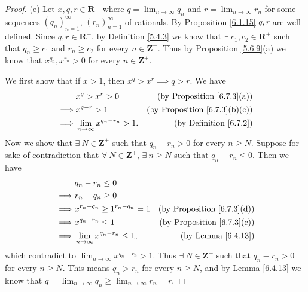 \begin{proof}{(e)}
    Let \(x, q, r \in \mathbf{R}^+\) where \(q = \lim_{n \to \infty} q_n\) and \(r = \lim_{n \to \infty} r_n\) for some sequences \((q_n)_{n = 1}^\infty\), \((r_n)_{n = 1}^\infty\) of rationals.
    By Proposition \ref{6.1.15} \(q, r\) are well-defined.
    Since \(q, r \in \mathbf{R}^+\), by Definition \ref{5.4.3} we know that \(\exists\ c_1, c_2 \in \mathbf{R}^+\) such that \(q_n \geq c_1\) and \(r_n \geq c_2\) for every \(n \in \mathbf{Z}^+\).
    Thus by Proposition \ref{5.6.9}(a) we know that \(x^{q_n}, x^{r_n} > 0\) for every \(n \in \mathbf{Z}^+\).

    We first show that if \(x > 1\), then \(x^q > x^r \implies q > r\).
    We have
    \begin{align*}
                 & x^q > x^r > 0                          & \text{(by Proposition \ref{6.7.3}(a))}    \\
        \implies & x^{q - r} > 1                          & \text{(by Proposition \ref{6.7.3}(b)(c))} \\
        \implies & \lim_{n \to \infty} x^{q_n - r_n} > 1. & \text{(by Definition \ref{6.7.2})}        \\
    \end{align*}
    Now we show that \(\exists\ N \in \mathbf{Z}^+\) such that \(q_n - r_n > 0\) for every \(n \geq N\).
    Suppose for sake of contradiction that \(\forall\ N \in \mathbf{Z}^+\), \(\exists\ n \geq N\) such that \(q_n - r_n \leq 0\).
    Then we have
    \begin{align*}
                 & q_n - r_n \leq 0                                                                   \\
        \implies & r_n - q_n \geq 0                                                                   \\
        \implies & x^{r_n - q_n} \geq 1^{r_n - q_n} = 1      & \text{(by Proposition \ref{6.7.3}(d))} \\
        \implies & x^{q_n - r_n} \leq 1                      & \text{(by Proposition \ref{6.7.3}(c))} \\
        \implies & \lim_{n \to \infty} x^{q_n - r_n} \leq 1, & \text{(by Lemma \ref{6.4.13})}
    \end{align*}
    which contradict to \(\lim_{n \to \infty} x^{q_n - r_n} > 1\).
    Thus \(\exists\ N \in \mathbf{Z}^+\) such that \(q_n - r_n > 0\) for every \(n \geq N\).
    This means \(q_n > r_n\) for every \(n \geq N\), and by Lemma \ref{6.4.13} we know that \(q = \lim_{n \to \infty} q_n \geq \lim_{n \to \infty} r_n = r\).


\end{proof}
